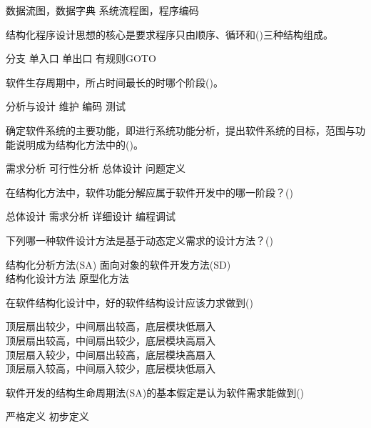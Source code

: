 \documentclass[answers]{exam}
\begin{document}
\begin{questions}
\begin{oneparchoices}
		\correctchoice 数据流图，数据字典
		\choice 系统流程图，程序编码
	\end{oneparchoices}
	\question 结构化程序设计思想的核心是要求程序只由顺序、循环和()三种结构组成。\\
	\begin{oneparchoices}
		\correctchoice 分支
		\choice 单入口
		\choice 单出口
		\choice 有规则GOTO
	\end{oneparchoices}
	\question 软件生存周期中，所占时间最长的时哪个阶段()。\\
	\begin{oneparchoices}
		\choice 分析与设计
		\correctchoice 维护
		\choice 编码
		\choice 测试
	\end{oneparchoices}
	\question 确定软件系统的主要功能，即进行系统功能分析，提出软件系统的目标，范围与功能说明成为结构化方法中的()。\\
	\begin{oneparchoices}
		\correctchoice 需求分析
		\choice 可行性分析
		\choice 总体设计
		\choice 问题定义
	\end{oneparchoices}
	\question 在结构化方法中，软件功能分解应属于软件开发中的哪一阶段？()\\
	\begin{oneparchoices}
		\correctchoice 总体设计
		\choice 需求分析
		\choice 详细设计
		\choice 编程调试
	\end{oneparchoices}
	\question 下列哪一种软件设计方法是基于动态定义需求的设计方法？()\\
	\begin{oneparchoices}
		\choice 结构化分析方法(SA)
		\correctchoice 面向对象的软件开发方法(SD)\\
		\choice 结构化设计方法
		\choice 原型化方法
	\end{oneparchoices}
	\question 在软件结构化设计中，好的软件结构设计应该力求做到()\\
	\begin{oneparchoices}
		\choice 顶层扇出较少，中间扇出较高，底层模块低扇入\\
		\correctchoice 顶层扇出较高，中间扇出较少，底层模块高扇入\\
		\choice 顶层扇入较少，中间扇出较高，底层模块高扇入\\
		\choice 顶层扇入较高，中间扇入较少，底层模块低扇入
	\end{oneparchoices}
	\question 软件开发的结构生命周期法(SA)的基本假定是认为软件需求能做到()\\
	\begin{oneparchoices}
		\correctchoice 严格定义
		\choice 初步定义

\end{oneparchoices}
\end{questions}
\end{document}
